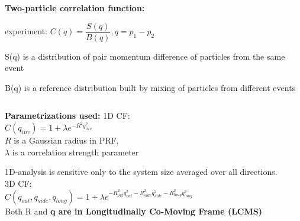 \documentclass[dvipsnames] {beamer}
\begin{document}
\begin{frame}[shrink=40]
\begin{columns}[c]
\begin{block}{{\bf \centering Two-particle correlation function:}}
\begin{center}
{                experiment: $C(q) = \dfrac{S(q)}{B(q)}, q = p_{1} - p_{2}$
                
                \alert {S(q)} is a distribution of pair momentum difference of particles from the same event
                
                \alert {B(q)} is a reference distribution built by mixing of particles from different events}
            \end{center}
          \end{block}
        \end{columns}
        \vskip -0.1cm
        \begin{columns}[t]
          \begin{block}{\bf \centering Parametrizations used:}     
            \centering 1D CF: \\
            \centering $C(q_{inv}) = 1 + \lambda e^{-R^{2} q_{inv}^{2}}$ \\
            $R$ is a Gaussian radius in PRF, \\
            $\lambda$ is a correlation strength parameter

            {\alert{1D-analysis}} is sensitive only to the system size averaged over all directions.\\
            \centering 3D CF: \\
            \centering $C(q_{out}, q_{side}, q_{long}) = 1 + \lambda e^{-R_{out}^{2}q_{out}^{2} - R_{side}^{2}q_{side}^{2} - R_{long}^{2}q_{long}^{2}}$ \\
            Both R and \bf{q}  are in Longitudinally Co-Moving Frame (LCMS) \\
                        

\end{block}
\end{columns}
\end{frame}
\end{document}
